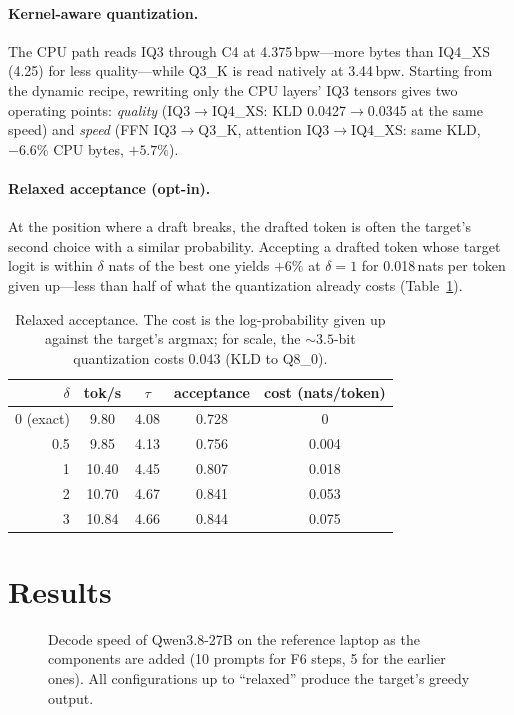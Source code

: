 \documentclass[10pt]{article}
\newcommand{\tps}{tok/s}
\begin{document}
\paragraph{Kernel-aware quantization.} The CPU path reads IQ3 through C4 at 4.375\,bpw---more bytes than IQ4\_XS
(4.25) for less quality---while Q3\_K is read natively at 3.44\,bpw. Starting from the dynamic recipe, rewriting
only the CPU layers' IQ3 tensors gives two operating points: \emph{quality} (IQ3$\to$IQ4\_XS: KLD 0.0427$\to$0.0345 at
the same speed) and \emph{speed} (FFN IQ3$\to$Q3\_K, attention IQ3$\to$IQ4\_XS: same KLD, $-6.6\%$ CPU bytes,
$+5.7\%$).

\paragraph{Relaxed acceptance (opt-in).} At the position where a draft breaks, the drafted token is often the target's
second choice with a similar probability. Accepting a drafted token whose target logit is within $\delta$ nats of the
best one yields $+6\%$ at $\delta=1$ for 0.018\,nats per token given up---less than half of what the quantization
already costs (Table~\ref{tab:relax}).

\begin{table}[t]
\centering\small
\begin{tabular}{rcccc}
\toprule
$\delta$ & \tps & $\tau$ & acceptance & cost (nats/token) \\
\midrule
0 (exact) & 9.80 & 4.08 & 0.728 & 0 \\
0.5 & 9.85 & 4.13 & 0.756 & 0.004 \\
1 & 10.40 & 4.45 & 0.807 & 0.018 \\
2 & 10.70 & 4.67 & 0.841 & 0.053 \\
3 & 10.84 & 4.66 & 0.844 & 0.075 \\
\bottomrule
\end{tabular}
\caption{Relaxed acceptance. The cost is the log-probability given up against the target's argmax; for scale, the
${\sim}3.5$-bit quantization costs 0.043 (KLD to Q8\_0).}
\label{tab:relax}
\end{table}

\section{Results}

\begin{figure}[t]
\centering

\caption{Decode speed of Qwen3.8-27B on the reference laptop as the components are added (10 prompts for F6 steps,
5 for the earlier ones). All configurations up to ``relaxed'' produce the target's greedy output.}
\label{fig:progression}
\end{figure}
\end{document}
